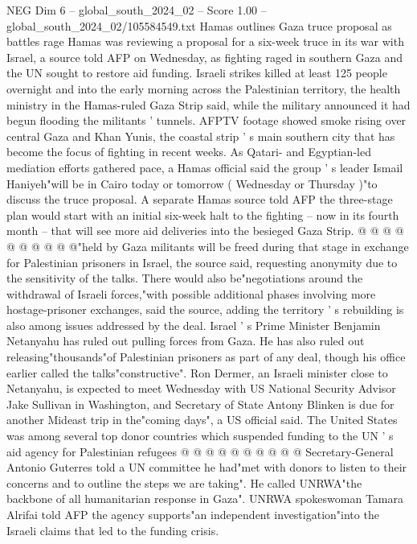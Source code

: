 \begin{textsample}{NEG Dim 6 – global\_south\_2024\_02 – Score 1.00 – global\_south\_2024\_02/105584549.txt}  \label{ex:f6_neg_269}
Hamas outlines Gaza truce proposal as battles rage Hamas was reviewing a proposal for a six-week truce in its war with Israel, a source told AFP on Wednesday, as fighting raged in southern Gaza and the UN sought to restore aid funding.
Israeli strikes killed at least 125 people overnight and into the early morning across the Palestinian territory, the health ministry in the Hamas-ruled Gaza Strip said, while the military announced it had begun flooding the militants ' tunnels.
AFPTV footage showed smoke rising over central Gaza and Khan Yunis, the coastal strip ' s main southern city that has become the focus of fighting in recent weeks.
As Qatari- and Egyptian-led mediation efforts gathered pace, a Hamas official said the group ' s leader Ismail Haniyeh"will be in Cairo today or tomorrow ( Wednesday or Thursday )"to discuss the truce proposal.
A separate Hamas source told AFP the three-stage plan would start with an initial six-week halt to the fighting -- now in its fourth month -- that will see more aid deliveries into the besieged Gaza Strip. @ @ @ @ @ @ @ @ @ @"held by Gaza militants will be freed during that stage in exchange for Palestinian prisoners in Israel, the source said, requesting anonymity due to the sensitivity of the talks.
There would also be"negotiations around the withdrawal of Israeli forces,"with possible additional phases involving more hostage-prisoner exchanges, said the source, adding the territory ' s rebuilding is also among issues addressed by the deal.
Israel ' s Prime Minister Benjamin Netanyahu has ruled out pulling forces from Gaza.
He has also ruled out releasing"thousands"of Palestinian prisoners as part of any deal, though his office earlier called the talks"constructive".
Ron Dermer, an Israeli minister close to Netanyahu, is expected to meet Wednesday with US National Security Advisor Jake Sullivan in Washington, and Secretary of State Antony Blinken is due for another Mideast trip in the"coming days", a US official said.
The United States was among several top donor countries which suspended funding to the UN ' s aid agency for Palestinian refugees @ @ @ @ @ @ @ @ @ @ Secretary-General Antonio Guterres told a UN committee he had"met with donors to listen to their concerns and to outline the steps we are taking".
He called UNRWA"the backbone of all humanitarian response in Gaza".
UNRWA spokeswoman Tamara Alrifai told AFP the agency supports"an independent investigation"into the Israeli claims that led to the funding crisis.

\end{textsample}
